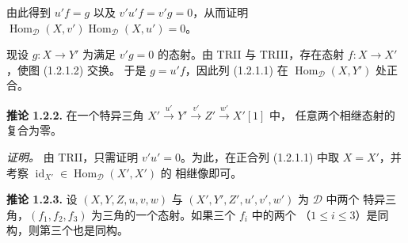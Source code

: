 由此得到 $u'f=g$ 以及 $v'u'f=v'g=0$，从而证明
$\operatorname{Hom}_{\mathcal D}(X,v')
\operatorname{Hom}_{\mathcal D}(X,u')=0$。

现设 $g\colon X\longrightarrow Y'$ 为满足 $v'g=0$ 的态射。由 TRII 与
TRIII，存在态射 $f\colon X\longrightarrow X'$，使图 (1.2.1.2) 交换。
于是 $g=u'f$，因此列 (1.2.1.1) 在
$\operatorname{Hom}_{\mathcal D}(X,Y')$ 处正合。

\medskip
\noindent\textbf{推论 1.2.2.}\quad
在一个特异三角
$X'\xrightarrow{u'}Y'\xrightarrow{v'}Z'\xrightarrow{w'}X'[1]$ 中，
任意两个相继态射的复合为零。

\noindent\emph{证明。}\quad
由 TRII，只需证明 $v'u'=0$。为此，在正合列 (1.2.1.1) 中取
$X=X'$，并考察
$\operatorname{id}_{X'}\in\operatorname{Hom}_{\mathcal D}(X',X')$ 的
相继像即可。

\medskip
\noindent\textbf{推论 1.2.3.}\quad
设 $(X,Y,Z,u,v,w)$ 与 $(X',Y',Z',u',v',w')$ 为 $\mathcal D$ 中两个
特异三角，$(f_1,f_2,f_3)$ 为三角的一个态射。如果三个 $f_i$ 中的两个
（$1\leq i\leq3$）是同构，则第三个也是同构。
\endgroup
